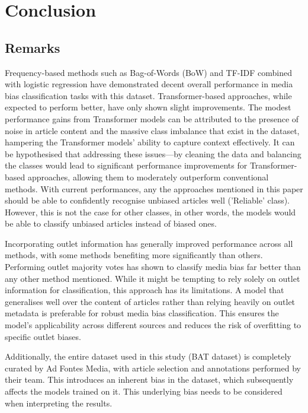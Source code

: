 \chapter{Conclusion}
\label{cha:7}

\section{Remarks}

Frequency-based methods such as Bag-of-Words (BoW) and TF-IDF combined with logistic regression have demonstrated decent overall performance in media bias classification tasks with this dataset. Transformer-based approaches, while expected to perform better, have only shown slight improvements. The modest performance gains from Transformer models can be attributed to the presence of noise in article content and the massive class imbalance that exist in the dataset, hampering the Transformer models' ability to capture context effectively. It can be hypothesised that addressing these issues—by cleaning the data and balancing the classes would lead to significant performance improvements for Transformer-based approaches, allowing them to moderately outperform conventional methods. With current performances, any the approaches mentioned in this paper should be able to confidently recognise unbiased articles well ('Reliable' class). However, this is not the case for other classes, in other words, the models would be able to classify unbiased articles instead of biased ones.

Incorporating outlet information has generally improved performance across all methods, with some methods benefiting more significantly than others. Performing outlet majority votes has shown to classify media bias far better than any other method mentioned. While it might be tempting to rely solely on outlet information for classification, this approach has its limitations. A model that generalises well over the content of articles rather than relying heavily on outlet metadata is preferable for robust media bias classification. This ensures the model's applicability across different sources and reduces the risk of overfitting to specific outlet biases.

Additionally, the entire dataset used in this study (BAT dataset) is completely curated by Ad Fontes Media, with article selection and annotations performed by their team. This introduces an inherent bias in the dataset, which subsequently affects the models trained on it. This underlying bias needs to be considered when interpreting the results.

